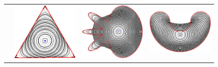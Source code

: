 \begin{figure}
\begin{tabular}{cccc}
&\includegraphics[scale=0.25]{figures/chapter8/graph-flow/triangle/neigh-0/summary.pdf} & \includegraphics[scale=0.25]{figures/chapter8/graph-flow/flower/neigh-0/summary.pdf} & \includegraphics[scale=0.25]{figures/chapter8/graph-flow/bean/neigh-0/summary.pdf}

\end{tabular}
\end{figure}
